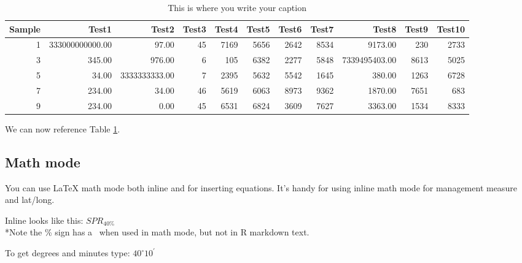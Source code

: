 \documentclass[]{article}
\begin{document}
\begin{table}[ht]
\centering
\caption{This is where you write your caption} 
\label{tab:Table_example}
\begin{tabular}{rrrrrrrrrrr}
  \hline
Sample & Test1 & Test2 & Test3 & Test4 & Test5 & Test6 & Test7 & Test8 & Test9 & Test10 \\ 
  \hline
  1 & 333000000000.00 & 97.00 &  45 & 7169 & 5656 & 2642 & 8534 & 9173.00 & 230 & 2733 \\ 
    3 & 345.00 & 976.00 &   6 & 105 & 6382 & 2277 & 5848 & 7339495403.00 & 8613 & 5025 \\ 
    5 & 34.00 & 3333333333.00 &   7 & 2395 & 5632 & 5542 & 1645 & 380.00 & 1263 & 6728 \\ 
    7 & 234.00 & 34.00 &  46 & 5619 & 6063 & 8973 & 9362 & 1870.00 & 7651 & 683 \\ 
    9 & 234.00 & 0.00 &  45 & 6531 & 6824 & 3609 & 7627 & 3363.00 & 1534 & 8333 \\ 
   \hline
\end{tabular}
\end{table}

We can now reference Table \ref{tab:Table_example}.

\subsection{Math mode}\label{math-mode}

You can use LaTeX math mode both inline and for inserting equations.
It's handy for using inline math mode for management measure and
lat/long.

Inline looks like this: \(SPR_{40\%}\)\\
*Note the \% sign has a ~when used in math mode, but not in R markdown
text.

To get degrees and minutes type: \(40^\circ 10^\prime\)
\end{document}
